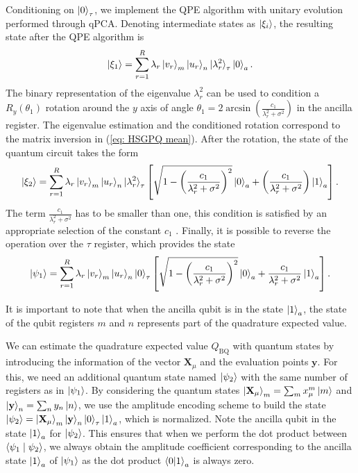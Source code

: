 \documentclass[10pt]{article}
\begin{document}
	Conditioning on $\ket{0}_\tau$, we implement the QPE algorithm with unitary evolution performed through qPCA.
	Denoting intermediate states as $\ket{\xi_i}$, the resulting state after the QPE algorithm is
	\begin{equation}
		\ket{\xi_1} = \sum_{r=1}^{R}\lambda_{r} \ket{v_{r}}_m \ket{u_{r}}_n \ket{\lambda_{r}^{2}}_\tau \ket{0}_a.
	\end{equation}
	The binary representation of the eigenvalue $\lambda_r^2$ can be used to condition a $R_{y}(\theta_1)$ rotation around the $y$ axis of angle $\theta_1 = 2\arcsin \left(\frac{c_1}{\lambda_r^2 + \sigma^2}\right)$ in the ancilla register. The eigenvalue estimation and the conditioned rotation correspond to the matrix inversion in (\ref{eq: HSGPQ mean}). After the rotation, the state of the quantum circuit takes the form
	\begin{equation}
		\ket{\xi_2} = \sum_{r=1}^{R}\lambda_{r} \ket{v_{r}}_m \ket{u_{r}}_n \ket{\lambda_{r}^{2}}_\tau \left[\sqrt{1 - \left(\frac{c_1}{\lambda_r^2 + \sigma^2}\right)^2}\ket{0}_a + \left(\frac{c_1}{\lambda_r^2 + \sigma^2}\right)\ket{1}_a\right].
	\end{equation}
	The term $\frac{c_1}{\lambda_r^2 + \sigma^2}$ has to be smaller than one, this condition is satisfied by an appropriate selection of the constant $c_1$ \citep{Cleve1998QAR}. Finally, it is possible to reverse the operation over the $\tau$ register, which provides the state
	\begin{equation}
		\ket{\psi_1} = \sum_{r=1}^{R}\lambda_{r} \ket{v_{r}}_m\ket{u_{r}}_n \ket{0}_\tau \left[\sqrt{1-\left(\frac{c_1}{\lambda_{r}^{2}+\sigma^{2}}\right)^2} \ket{0}_a +\frac{c_1}{\lambda_{r}^{2}+\sigma^{2}}\ket{1}_a\right].
	\end{equation}
	
	It is important to note that when the ancilla qubit is in the state $\ket{1}_a$, the state of the qubit registers $m$ and $n$ represents part of the quadrature expected value. 
	
	We can estimate the quadrature expected value $Q_{\mathrm{BQ}}$ with quantum states by introducing the information of the vector $\mathbf{X}_{\mu}$ and the evaluation points $\mathbf{y}$. For this, we need an additional quantum state named $\ket{\psi_2}$ with the same number of registers as in $\ket{\psi_1}$. By considering the quantum states $\ket{\mathbf{X}_\mu}_m = \sum_m x_\mu^m \ket{m} $ and $\ket{\mathbf{y}}_n = \sum_n y_n \ket{n}$, we use the amplitude encoding scheme to build the state $\ket{\psi_2} = \ket{\mathbf{X}_\mu}_m \ket{\mathbf{y}}_n \ket{0}_\tau \ket{1}_a$, which is normalized.  Note the ancilla qubit in the state $\ket{1}_a$ for $\ket{\psi_{2}}$. This ensures that when we perform the dot product between $\braket{\psi_1\mid\psi_2}$, we always obtain the amplitude coefficient corresponding to  the ancilla state $\ket{1}_a$ of $\ket{\psi_{1}}$ as 
	the dot product $\braket{0|1}_a$ is always zero.
	
\end{document}
